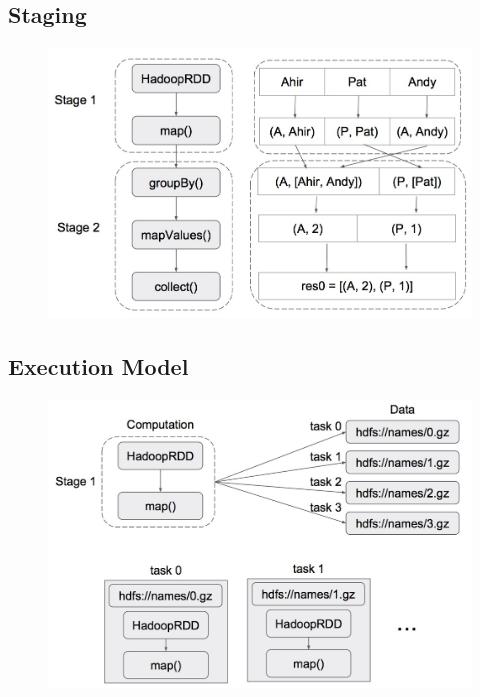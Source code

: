 \subsection{Staging}
\begin{frame}
\begin{figure}
\centering
\includegraphics[width=0.6\linewidth]{figures/example2-staging.jpg}
\end{figure}
\end{frame}

\subsection{Execution Model}
\begin{frame}
\begin{figure}
\centering
\includegraphics[width=0.8\linewidth]{figures/example2-tasking.jpg}
\end{figure}
\end{frame}


